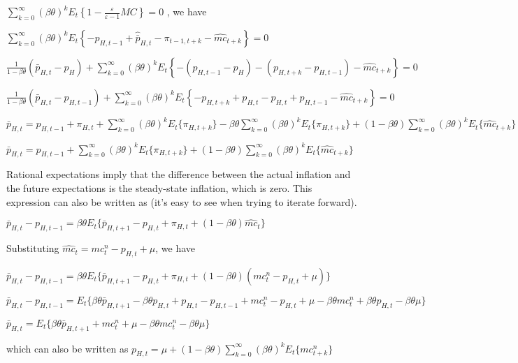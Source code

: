 \documentclass[
]{article}
\begin{document}
\(\displaystyle \sum_{k=0}^\infty (\beta \theta)^kE_t \left\{ 1-\frac{\varepsilon}{\varepsilon-1} MC \right\}=0\)
, we have

\(\displaystyle \sum_{k=0}^\infty (\beta \theta)^kE_t \left\{ -\hat{p}_{H,t-1} +\hat{\bar{p}}_{H,t}-\pi_{t-1,t+k} - \widehat{mc}_{t+k} \right\}=0\)

\(\displaystyle \frac{1}{1-\beta \theta}(\bar{p}_{H,t}-p_{H}) + \sum_{k=0}^\infty (\beta \theta)^kE_t \left\{ -(p_{H,t-1}-p_{H}) -(p_{H,t+k}-p_{H,t-1}) - \widehat{mc}_{t+k} \right\}=0\)

\(\displaystyle \frac{1}{1-\beta \theta}(\bar{p}_{H,t}-p_{H,t-1}) + \sum_{k=0}^\infty (\beta \theta)^kE_t \left\{ -p_{H,t+k}+p_{H,t}-p_{H,t}+p_{H,t-1} - \widehat{mc}_{t+k} \right\}=0\)

\(\displaystyle \bar{p}_{H,t} = p_{H,t-1} + \pi_{H,t}+ \sum_{k=0}^\infty (\beta \theta)^k E_t \{\pi_{H,t+k} \} -\beta \theta\sum_{k=0}^\infty (\beta \theta)^k E_t \{\pi_{H,t+k} \} + (1-\beta \theta)\sum_{k=0}^\infty (\beta \theta)^k E_t \{\widehat{mc}_{t+k} \}\)

\(\displaystyle \bar{p}_{H,t} = p_{H,t-1} + \sum_{k=0}^\infty (\beta \theta)^k E_t \{\pi_{H,t+k} \} + (1-\beta \theta)\sum_{k=0}^\infty (\beta \theta)^k E_t \{\widehat{mc}_{t+k} \}\)

Rational expectations imply that the difference between the actual
inflation and the future expectations is the steady-state inflation,
which is zero. This expression can also be written as (it's easy to see
when trying to iterate forward).

\(\bar{p}_{H,t}-p_{H,t-1}=\beta \theta E_t \{ \bar{p}_{H,t+1}-p_{H,t} + \pi_{H,t}+(1-\beta \theta)\widehat{mc}_t\}\)

Substituting \(\widehat{mc}_t = mc_t^n-p_{H,t}+\mu\), we have

\(\bar{p}_{H,t}-p_{H,t-1}=\beta \theta E_t \{ \bar{p}_{H,t+1}-p_{H,t} + \pi_{H,t}+(1-\beta \theta)(mc_t^n-p_{H,t}+\mu)\}\)

\(\bar{p}_{H,t}-p_{H,t-1} = E_t \{ \beta \theta\bar{p}_{H,t+1}-\beta \theta p_{H,t} + p_{H,t}- p_{H,t-1} +mc_t^n-p_{H,t}+\mu - \beta \theta mc_t^n + \beta \theta p_{H,t} - \beta \theta \mu \}\)

\(\bar{p}_{H,t} = E_t \{ \beta \theta\bar{p}_{H,t+1} +mc_t^n +\mu - \beta \theta mc_t^n - \beta \theta \mu \}\)

which can also be written as
\(\displaystyle p_{H,t}=\mu + (1-\beta \theta)\sum_{k=0}^\infty(\beta \theta)^kE_t \{ mc_{t+k}^n\}\)
\end{document}
